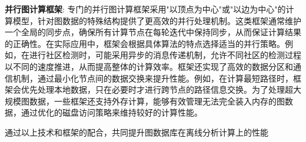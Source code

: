 \textbf{并行图计算框架}: 专门的并行图计算框架采用"以顶点为中心"或"以边为中心"的计算模型，针对图数据的特殊结构提供了更高效的并行处理机制。这类框架通常维护一个全局的同步点，确保所有计算节点在每轮迭代中保持同步，从而保证计算结果的正确性。在实际应用中，框架会根据具体算法的特点选择适当的并行策略。例如，在进行社区检测时，可能采用异步的消息传递机制，允许不同社区的检测过程以不同的速度推进，从而提高整体的计算效率。框架还实现了高效的数据分区和通信机制，通过最小化节点间的数据交换来提升性能。例如，在计算最短路径时，框架会优先处理本地数据，只在必要时才进行跨节点的路径信息交换。为了处理超大规模图数据，一些框架还支持外存计算，能够有效管理无法完全装入内存的图数据，通过优化的磁盘访问策略来维持较好的计算性能。

通过以上技术和框架的配合，共同提升图数据库在离线分析计算上的性能
